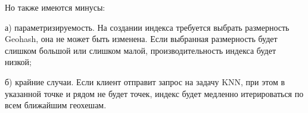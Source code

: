 Но также имеются минусы:
\par а) параметризируемость. На создании индекса требуется выбрать размерность Geohash, она не может быть изменена. Если выбранная размерность будет слишком большой или слишком малой, производительность индекса будет низкой;
\par б) крайние случаи. Если клиент отправит запрос на задачу KNN, при этом в указанной точке и рядом не будет точек, индекс будет медленно итерироваться по всем ближайшим геохешам.